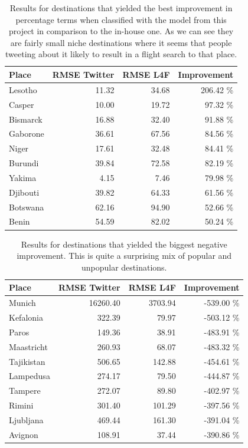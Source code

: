 \documentclass[minf,frontabs,twoside,singlespacing,parskip]{infthesis}
\begin{document}
\begin{table}[h]
\begin{center}
\begin{tabular}{ l | r | r | r}
Place & RMSE Twitter & RMSE L4F & Improvement \\
\hline
Lesotho & 11.32 & 34.68 & 206.42 \% \\ 
Casper & 10.00 & 19.72 & 97.32 \% \\ 
Bismarck & 16.88 & 32.40 & 91.88 \% \\ 
Gaborone & 36.61 & 67.56 & 84.56 \% \\ 
Niger & 17.61 & 32.48 & 84.41 \% \\ 
Burundi & 39.84 & 72.58 & 82.19 \% \\ 
Yakima & 4.15 & 7.46 & 79.98 \% \\ 
Djibouti & 39.82 & 64.33 & 61.56 \% \\ 
Botswana & 62.16 & 94.90 & 52.66 \% \\ 
Benin & 54.59 & 82.02 & 50.24 \% \\ 
\end{tabular}
\end{center}
\caption{Results for destinations that yielded the best improvement in percentage terms when classified with the model from this project in comparison to the in-house one. As we can see they are fairly small niche destinations where it seems that people tweeting about it likely to result in a flight search to that place.}
\end{table}

\begin{table}[h]
\begin{center}
\begin{tabular}{ l | r | r | r}
Place & RMSE Twitter & RMSE L4F & Improvement \\
\hline
Munich & 16260.40 & 3703.94 & -539.00 \% \\
Kefalonia & 322.39 & 79.97 & -503.12 \% \\
Paros & 149.36 & 38.91 & -483.91 \% \\
Maastricht & 260.93 & 68.07 & -483.32 \% \\
Tajikistan & 506.65 & 142.88 & -454.61 \% \\
Lampedusa & 274.17 & 79.50 & -444.87 \% \\
Tampere & 272.07 & 89.80 & -402.97 \% \\
Rimini & 301.40 & 101.29 & -397.56 \% \\
Ljubljana & 469.44 & 161.30 & -391.04 \% \\
Avignon & 108.91 & 37.44 & -390.86 \% \\
\end{tabular}
\end{center}
\caption{Results for destinations that yielded the biggest negative improvement. This is quite a surprising mix of popular and unpopular destinations. }
\end{table}
\end{document}
